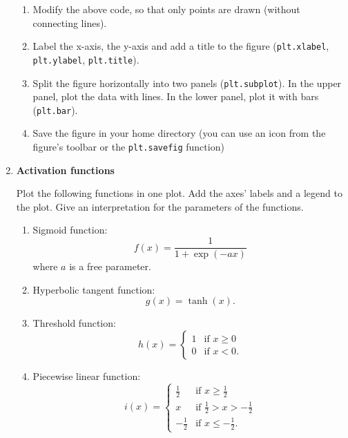 \documentclass[12pt, a4]{article}
\begin{document}
\begin{enumerate}
    \begin{enumerate}
        \item Modify the above code, so that only points are drawn (without
        connecting lines).
        \item Label the x-axis, the y-axis and add a title to the figure
        (\texttt{plt.xlabel}, \texttt{plt.ylabel}, \texttt{plt.title}).
        \item Split the figure horizontally into two
        panels (\texttt{plt.subplot}). In the upper panel, plot the data
        with lines. In the lower panel, plot it with bars (\texttt{plt.bar}).
        \item Save the figure in your home directory (you can use an icon from
        the figure's toolbar or the \texttt{plt.savefig} function)
    \end{enumerate}

    \item \textbf{Activation functions}
    \label{ex:activation}

        Plot the following functions in one plot. Add the axes' labels and a
        legend to the plot. Give an interpretation for the parameters of
        the functions.
    
        \begin{enumerate}
            \item Sigmoid function:
                $$f(x)=\frac{1}{1+\exp(-ax)}$$
                where $a$ is a free parameter.
            \item Hyperbolic tangent function:
                $$g(x)=\tanh(x).$$
            \item Threshold function:
                \begin{equation*}
                    h(x)=\begin{cases}1 & \text{if $x\geq0$} \\
                                    0 & \text{if $x<0$.}
                        \end{cases}
                \end{equation*}
            \item Piecewise linear function:
                \begin{equation*}
                    i(x)=\begin{cases} \frac{1}{2}& \text{if $x\geq\frac{1}{2}$} \\
                        x & \text{if $\frac{1}{2}>x>-\frac{1}{2}$} \\
                        -\frac{1}{2} & \text{if $x\leq-\frac{1}{2}$.}
                        \end{cases}
                \end{equation*}
    

\end{enumerate}
\end{enumerate}
\end{document}
